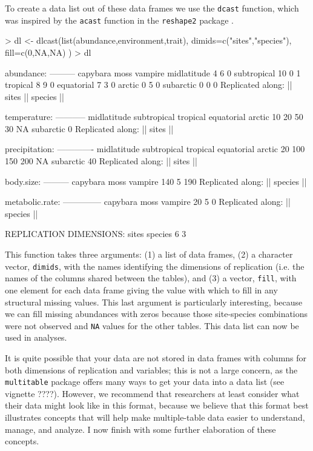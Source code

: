 \documentclass{article}
\newcommand{\code}[1]{\texttt{#1}}
\numberwithin{exercise}{section}
\begin{document}
To create a data list out of these data frames we use the \code{dcast} function, which was inspired by the \code{acast} function in the \code{reshape2} package \citep{Wickham2007}.
\begin{Schunk}
\begin{Sinput}
> dl <- dlcast(list(abundance,environment,trait),
 	dimids=c("sites","species"),
 	fill=c(0,NA,NA)
 )
> dl
\end{Sinput}
\begin{Soutput}
abundance:
---------
            capybara moss vampire
midlatitude        4    6       0
subtropical       10    0       1
tropical           8    9       0
equatorial         7    3       0
arctic             0    5       0
subarctic          0    0       0
Replicated along:  || sites || species || 


temperature:
-----------
midlatitude subtropical    tropical  equatorial      arctic 
         10          20          50          30          NA 
  subarctic 
          0 
Replicated along:  || sites || 


precipitation:
-------------
midlatitude subtropical    tropical  equatorial      arctic 
         20         100         150         200          NA 
  subarctic 
         40 
Replicated along:  || sites || 


body.size:
---------
capybara     moss  vampire 
     140        5      190 
Replicated along:  || species || 


metabolic.rate:
--------------
capybara     moss  vampire 
      20        5        0 
Replicated along:  || species || 


REPLICATION DIMENSIONS: 
  sites species 
      6       3 
\end{Soutput}
\end{Schunk}
This function takes three arguments:  (1) a list of data frames, (2) a character vector, \code{dimids}, with the names identifying the dimensions of replication (i.e. the names of the columns shared between the tables), and (3) a vector, \code{fill}, with one element for each data frame giving the value with which to fill in any structural missing values.  This last argument is particularly interesting, because we can fill missing abundances with zeros because those site-species combinations were not observed and \code{NA} values for the other tables.  This data list can now be used in analyses.

It is quite possible that your data are not stored in data frames with columns for both dimensions of replication and variables; this is not a large concern, as the \code{multitable} package offers many ways to get your data into a data list (see vignette ????).  However, we recommend that researchers at least consider what their data might look like in this format, because we believe that this format best illustrates concepts that will help make multiple-table data easier to understand, manage, and analyze.  I now finish with some further elaboration of these concepts.
\end{document}
